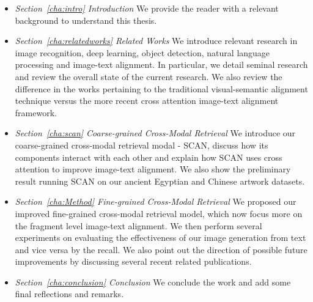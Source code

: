 \begin{itemize}
    
    \item \textit{Section~\ref{cha:intro} Introduction}\newline
    We provide the reader with a relevant background to understand this thesis.

    \item \textit{Section~\ref{cha:relatedworks} Related Works}\newline
    We introduce relevant research in image recognition, deep learning, object detection, natural language processing and image-text alignment. In particular, we detail seminal research and review the overall state of the current research. We also review the difference in the works pertaining to the traditional visual-semantic alignment technique versus the more recent cross attention image-text alignment framework.
    
    \item \textit{Section~\ref{cha:scan} Coarse-grained Cross-Modal Retrieval}\newline
    We introduce our coarse-grained cross-modal retrieval modal - SCAN, discuss how its components interact with each other and explain how SCAN uses cross attention to improve image-text alignment. We also show the preliminary result running SCAN on our ancient Egyptian and Chinese artwork datasets.
    
    \item \textit{Section~\ref{cha:Method} Fine-grained Cross-Modal Retrieval}\newline
    We proposed our improved fine-grained cross-modal retrieval model, which now focus more on the fragment level image-text alignment. We then perform several experiments on evaluating the effectiveness of our image generation from text and vice versa by the recall. We also point out the direction of possible future improvements by discussing several recent related publications.
    
    \item \textit{Section~\ref{cha:conclusion} Conclusion}\newline
    We conclude the work and add some final reflections and remarks.
\end{itemize}
